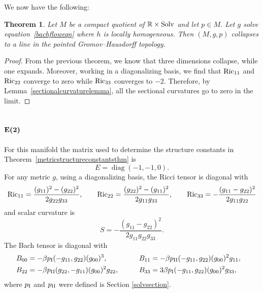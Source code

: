 \documentclass[pdftex]{sigma}
\numberwithin{equation}{section}
\newtheorem{Theorem}{Theorem}[section]
\newcommand{\diag}{\operatorname{diag}} %
\begin{document}
We now have the following:

\begin{Theorem}Let $M$ be a compact quotient of $\mathbb{R} \times {\rm Solv}$ and let $p \in M$. Let $g$ solve equa\-tion~\eqref{bachfloweqn} where $h$ is locally homogeneous. Then $(M, g, p)$ collapses to a line in the pointed Gromov--Hausdorff topology.
\end{Theorem}

\begin{proof}From the previous theorem, we know that three dimensions collapse, while one expands. Moreover, working in a diagonalizing basis, we find that ${\rm Ric}_{11}$ and ${\rm Ric}_{22}$ converge to zero while ${\rm Ric}_{33}$ converges to $-2$. Therefore, by Lemma~\ref{sectionalcurvaturelemma}, all the sectional curvatures go to zero in the limit.
\end{proof}

\subsection[${\rm E}(2)$]{$\boldsymbol{{\rm E}(2)}$}

For this manifold the matrix used to determine the structure constants in Theorem~\ref{metricstructureconstantsthm} is
\[
E = \diag(-1, -1, 0).
\]
For any metric $g$, using a diagonalizing basis, the Ricci tensor is diagonal with
\begin{gather*}
{\rm Ric}_{11} = \frac{(g_{11})^2 - (g_{22})^2}{2 g_{22} g_{33}},\qquad
{\rm Ric}_{22} = \frac{(g_{22})^2 - (g_{11})^2}{2 g_{11} g_{33}},\qquad
{\rm Ric}_{33} = - \frac{(g_{11} - g_{22})^2}{2 g_{11} g_{22}}
\end{gather*}
and scalar curvature is
\[
S = -\frac{(g_{11} - g_{22})^2}{2 g_{11} g_{22} g_{33}}.
\]
The Bach tensor is diagonal with
\begin{alignat*}{3}
& B_{00}= -\beta p_{\rm I}(-g_{11}, g_{22}) (g_{00})^3,\qquad &&
B_{11}= -\beta p_{\rm II}(-g_{11}, g_{22}) (g_{00})^2 g_{11}, &\\
& B_{22}= -\beta p_{\rm II}(g_{22}, -g_{11}) (g_{00})^2 g_{22}, \qquad &&
B_{33}= 3\beta p_{\rm I}(-g_{11}, g_{22}) (g_{00})^2 g_{33},&
\end{alignat*}
where $p_{\rm I}$ and $p_{\rm II}$ were defined is Section \ref{solvsection}.
\end{document}

